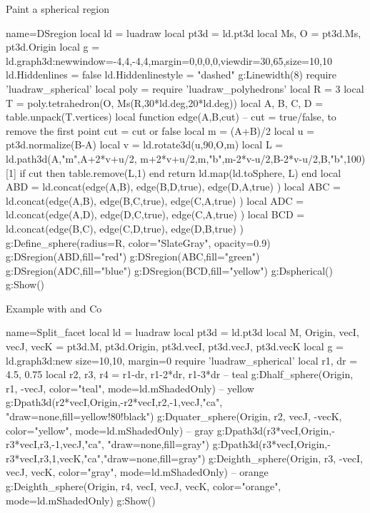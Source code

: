 \begin{demo}{Paint a spherical region}
\begin{luadraw}{name=DSregion}
local ld = luadraw
local pt3d = ld.pt3d
local Ms, O = pt3d.Ms, pt3d.Origin
local g = ld.graph3d:new{window={-4,4,-4,4},margin={0,0,0,0},viewdir={30,65},size={10,10}}
ld.Hiddenlines = false
ld.Hiddenlinestyle = "dashed"
g:Linewidth(8)
require 'luadraw_spherical'
local poly = require 'luadraw_polyhedrons'
local R = 3
local T = poly.tetrahedron(O, Ms(R,30*ld.deg,20*ld.deg))
local A, B, C, D = table.unpack(T.vertices)
local function edge(A,B,cut) -- cut = true/false, to remove the first point
    cut = cut or false
    local m = (A+B)/2
    local u = pt3d.normalize(B-A)
    local v = ld.rotate3d(u,90,{O,m})
    local L = ld.path3d({A,"m",A+2*v+u/2, m+2*v+u/2,m,"b",m-2*v-u/2,B-2*v-u/2,B,"b"},100)[1]
    if cut then table.remove(L,1) end
    return ld.map(ld.toSphere, L)
end
local ABD = ld.concat(edge(A,B), edge(B,D,true), edge(D,A,true) )
local ABC = ld.concat(edge(A,B), edge(B,C,true), edge(C,A,true) )
local ADC = ld.concat(edge(A,D), edge(D,C,true), edge(C,A,true) )
local BCD = ld.concat(edge(B,C), edge(C,D,true), edge(D,B,true) )
g:Define_sphere({radius=R, color="SlateGray", opacity=0.9})
g:DSregion(ABD,{fill="red"})
g:DSregion(ABC,{fill="green"})
g:DSregion(ADC,{fill="blue"})
g:DSregion(BCD,{fill="yellow"})
g:Dspherical()
g:Show()
\end{luadraw}
\end{demo}

\begin{demo}{Example with  and Co}
\begin{luadraw}{name=Split_facet}
local ld = luadraw
local pt3d = ld.pt3d
local M, Origin, vecI, vecJ, vecK = pt3d.M, pt3d.Origin, pt3d.vecI, pt3d.vecJ, pt3d.vecK
local g = ld.graph3d:new{ size={10,10}, margin=0 }
require 'luadraw_spherical'
local r1, dr = 4.5, 0.75
local r2, r3, r4 = r1-dr, r1-2*dr, r1-3*dr
-- teal
g:Dhalf_sphere(Origin, r1, -vecJ, {color="teal", mode=ld.mShadedOnly})
-- yellow
g:Dpath3d({r2*vecI,Origin,-r2*vecI,r2,-1,vecJ,"ca"}, "draw=none,fill=yellow!80!black")
g:Dquater_sphere(Origin, r2, vecJ, -vecK, {color="yellow", mode=ld.mShadedOnly})
-- gray
g:Dpath3d({r3*vecI,Origin,-r3*vecI,r3,-1,vecJ,"ca"}, "draw=none,fill=gray")
g:Dpath3d({r3*vecI,Origin,-r3*vecI,r3,1,vecK,"ca"},"draw=none,fill=gray")
g:Deighth_sphere(Origin, r3, -vecI, vecJ, vecK, {color="gray", mode=ld.mShadedOnly})
-- orange
g:Deighth_sphere(Origin, r4, vecI, vecJ, vecK, {color="orange", mode=ld.mShadedOnly})
g:Show()
\end{luadraw}
\end{demo}
